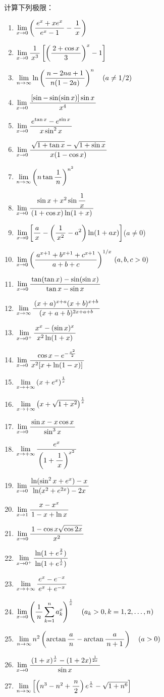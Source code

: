 \begin{ext}
	计算下列极限：
	\begin{enumerate}[(1)]
		\item $\limx0\left(\df{e^x+xe^x}{e^x-1}-\df1x\right)$
		\item $\limx0\df1{x^3}\left[\left(\df{2+\cos x}3\right)^x-1\right]$
		\item $\limn\ln\left(\df{n-2na+1}{n(1-2a)}\right)^n\quad(a\ne1/2)$
		\item $\limx0\df{[\sin-\sin(\sin x)]\sin x}{x^4}$
		\item $\limx0\df{e^{\tan x}-e^{\sin x}}{x\sin^2x}$
		\item $\limx0\df{\sqrt{1+\tan x}-\sqrt{1+\sin x}}{x(1-\cos x)}$
		\item $\limn\left(n\tan\df1n\right)^{n^2}$
		\item $\limx0\df{\sin x+x^2\sin\df1x}{(1+\cos x)\ln(1+x)}$
		\item $\limx0\left[\df
		  ax-\left(\df1{x^2}-a^2\right)\ln(1+ax)\right]$\quad($a\ne 0$)
		\item $\limx{0}\left(\df{a^{x+1}+b^{x+1}+c^{x+1}}{a+b+c}\right)^{1/x}
		  \,(a,b,c>0)$
		\item $\limx{0}\df{\tan(\tan x)-\sin(\sin x)}{\tan x-\sin x}$ 
		\item $\limx{\infty}\df{(x+a)^{x+a}(x+b)^{x+b}}{(x+a+b)^{2x+a+b}}$
		\item $\limx{0^+}\df{x^x-(\sin x)^x}{x^2\ln(1+x)}$
		\item $\limx0\df{\cos x-e^{-\frac{x^2}2}}{x^2[x+\ln(1-x)]}$
		\item $\limx{+\infty}\left(x+e^x\right)^{\frac1x}$
		\item $\limx{+\infty}\left(x+\sqrt{1+x^2}\right)^{\frac1x}$
		\item $\limx0\df{\sin x-x\cos x}{\sin^3x}$
		\item $\limx{+\infty}\df{e^x}{\left(1+\df1x\right)^{x^2}}$
		\item $\limx0\df{\ln(\sin^2x+e^x)-x}{\ln(x^2+e^{2x})-2x}$
		\item $\limx1\df{x-x^x}{1-x+\ln x}$
		\item $\limx0\df{1-\cos x\sqrt{\cos2x}}{x^2}$
		\item $\limx{0^+}\df{\ln(1+e^{\frac2x})}{\ln(1+e^{\frac1x})}$
		\item $\limx{+\infty}\df{e^x-e^{-x}}{e^x+e^{-x}}$
		\item $\limx0\left(\df1n\sum\limits_{k=1}^na_k^x\right)^{\frac1x}
		  \quad (a_k>0,k=1,2,\ldots,n)$
		\item $\limn n^2\left(\arctan\df an-\arctan\df a{n+1}\right)\quad (a>0)$
		\item $\limx0\df{(1+x)^{\frac1x}-(1+2x)^{\frac1{2x}}}{\sin x}$
		\item $\limn\left[\left(n^3-n^2+\df n2\right)e^{\frac1n}-\sqrt{1+n^6}\right]$
	  \end{enumerate}
\end{ext}


